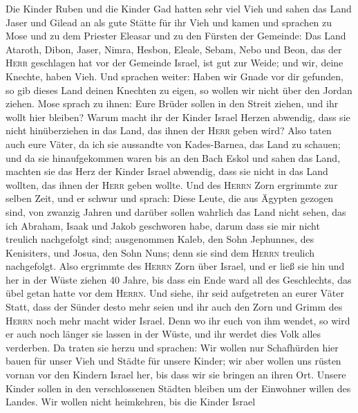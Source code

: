  Die Kinder Ruben und die Kinder Gad hatten sehr viel Vieh
und sahen das Land Jaser und Gilead an als gute Stätte für ihr Vieh
 und kamen und sprachen zu Mose und zu dem Priester
Eleasar und zu den Fürsten der Gemeinde:  Das Land
Ataroth, Dibon, Jaser, Nimra, Hesbon, Eleale, Sebam, Nebo und Beon,
 das der \textsc{Herr} geschlagen hat vor der Gemeinde
Israel, ist gut zur Weide; und wir, deine Knechte, haben Vieh.
 Und sprachen weiter: Haben wir Gnade vor dir gefunden, so
gib dieses Land deinen Knechten zu eigen, so wollen wir nicht über den
Jordan ziehen.  Mose sprach zu ihnen: Eure Brüder sollen
in den Streit ziehen, und ihr wollt hier bleiben?  Warum
macht ihr der Kinder Israel Herzen abwendig, dass sie nicht
hinüberziehen in das Land, das ihnen der \textsc{Herr} geben wird?
 Also taten auch eure Väter, da ich sie aussandte von
Kades-Barnea, das Land zu schauen;  und da sie
hinaufgekommen waren bis an den Bach Eskol und sahen das Land, machten
sie das Herz der Kinder Israel abwendig, dass sie nicht in das Land
wollten, das ihnen der \textsc{Herr} geben wollte.  Und
des \textsc{Herrn} Zorn ergrimmte zur selben Zeit, und er schwur und
sprach:  Diese Leute, die aus Ägypten gezogen sind, von
zwanzig Jahren und darüber sollen wahrlich das Land nicht sehen, das ich
Abraham, Isaak und Jakob geschworen habe, darum dass sie mir nicht
treulich nachgefolgt sind;  ausgenommen Kaleb, den Sohn
Jephunnes, des Kenisiters, und Josua, den Sohn Nuns; denn sie sind dem
\textsc{Herrn} treulich nachgefolgt.  Also ergrimmte des
\textsc{Herrn} Zorn über Israel, und er ließ sie hin und her in der
Wüste ziehen 40 Jahre, bis dass ein Ende ward all des Geschlechts, das
übel getan hatte vor dem \textsc{Herrn}.  Und siehe, ihr
seid aufgetreten an eurer Väter Statt, dass der Sünder desto mehr seien
und ihr auch den Zorn und Grimm des \textsc{Herrn} noch mehr macht wider
Israel.  Denn wo ihr euch von ihm wendet, so wird er auch
noch länger sie lassen in der Wüste, und ihr werdet dies Volk alles
verderben.  Da traten sie herzu und sprachen: Wir wollen
nur Schafhürden hier bauen für unser Vieh und Städte für unsere Kinder;
 wir aber wollen uns rüsten vornan vor den Kindern Israel
her, bis dass wir sie bringen an ihren Ort. Unsere Kinder sollen in den
verschlossenen Städten bleiben um der Einwohner willen des Landes.
 Wir wollen nicht heimkehren, bis die Kinder Israel

